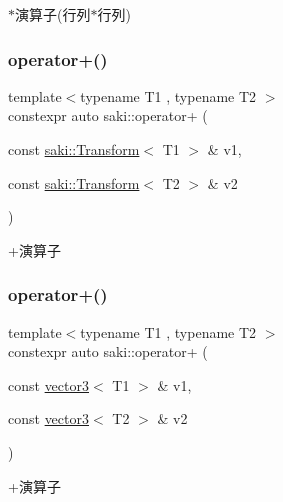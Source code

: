 $\ast$演算子(行列$\ast$行列) 

\mbox{\label{namespacesaki_afaf794508bac90671fcdf32ce337f966}} 
\subsubsection{\texorpdfstring{operator+()}{operator+()}\hspace{0.1cm}{\footnotesize\ttfamily [1/5]}}
{\footnotesize\ttfamily template$<$typename T1 , typename T2 $>$ \\
constexpr auto saki\+::operator+ (\begin{DoxyParamCaption}\item[{const \mbox{\hyperlink{classsaki_1_1_transform}{saki\+::\+Transform}}$<$ T1 $>$ \&}]{v1,  }\item[{const \mbox{\hyperlink{classsaki_1_1_transform}{saki\+::\+Transform}}$<$ T2 $>$ \&}]{v2 }\end{DoxyParamCaption})}



+演算子 

\mbox{\label{namespacesaki_af2eb9872710ab7ebca5e7a665f1a7cd7}} 
\subsubsection{\texorpdfstring{operator+()}{operator+()}\hspace{0.1cm}{\footnotesize\ttfamily [2/5]}}
{\footnotesize\ttfamily template$<$typename T1 , typename T2 $>$ \\
constexpr auto saki\+::operator+ (\begin{DoxyParamCaption}\item[{const \mbox{\hyperlink{classsaki_1_1vector3}{vector3}}$<$ T1 $>$ \&}]{v1,  }\item[{const \mbox{\hyperlink{classsaki_1_1vector3}{vector3}}$<$ T2 $>$ \&}]{v2 }\end{DoxyParamCaption})}



+演算子 

\mbox{\label{namespacesaki_aba02830a0fe4fd92a264f80bd5f6cd65}} 
